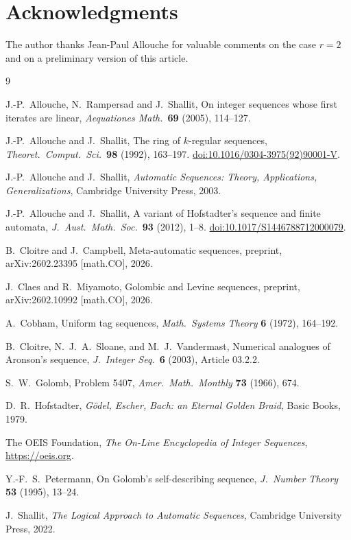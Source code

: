 \documentclass[12pt]{article}
\theoremstyle{definition}
\theoremstyle{remark}
\begin{document}
\section*{Acknowledgments}

The author thanks Jean-Paul Allouche for valuable comments on the case $r=2$
and on a preliminary version of this article.

\begin{thebibliography}{9}

J.-P.\ Allouche, N.\ Rampersad and J.\ Shallit,
On integer sequences whose first iterates are linear,
\emph{Aequationes Math.}\ \textbf{69} (2005), 114--127.

J.-P.\ Allouche and J.\ Shallit,
The ring of $k$-regular sequences,
\emph{Theoret.\ Comput.\ Sci.}\ \textbf{98} (1992), 163--197.
\newblock \href{https://doi.org/10.1016/0304-3975(92)90001-V}{doi:10.1016/0304-3975(92)90001-V}.

J.-P.\ Allouche and J.\ Shallit,
\emph{Automatic Sequences: Theory, Applications, Generalizations},
Cambridge University Press, 2003.

J.-P.\ Allouche and J.\ Shallit,
A variant of Hofstadter's sequence and finite automata,
\emph{J.\ Aust.\ Math.\ Soc.}\ \textbf{93} (2012), 1--8.
\newblock \href{https://doi.org/10.1017/S1446788712000079}{doi:10.1017/S1446788712000079}.

B.\ Cloitre and J.\ Campbell,
Meta-automatic sequences,
preprint, arXiv:2602.23395 [math.CO], 2026.

J.\ Claes and R.\ Miyamoto,
Golombic and Levine sequences,
preprint, arXiv:2602.10992 [math.CO], 2026.

A.\ Cobham,
Uniform tag sequences,
\emph{Math.\ Systems Theory} \textbf{6} (1972), 164--192.

B.\ Cloitre, N.~J.~A.\ Sloane, and M.~J.\ Vandermast,
Numerical analogues of Aronson's sequence,
\emph{J.\ Integer Seq.}\ \textbf{6} (2003), Article 03.2.2.

S.~W.\ Golomb,
Problem 5407,
\emph{Amer.\ Math.\ Monthly} \textbf{73} (1966), 674.

D.~R.\ Hofstadter,
\emph{G\"odel, Escher, Bach: an Eternal Golden Braid},
Basic Books, 1979.

The OEIS Foundation,
\emph{The On-Line Encyclopedia of Integer Sequences},
\url{https://oeis.org}.

Y.-F.~S.\ Petermann,
On Golomb's self-describing sequence,
\emph{J.\ Number Theory} \textbf{53} (1995), 13--24.

J.\ Shallit,
\emph{The Logical Approach to Automatic Sequences},
Cambridge University Press, 2022.

\end{thebibliography}
\end{document}
